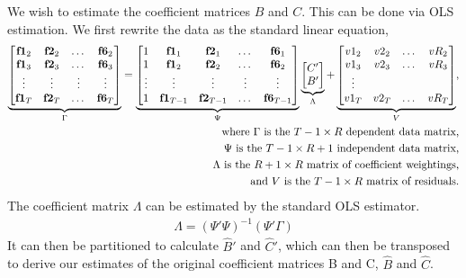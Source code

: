 \documentclass[11pt, letterpaper]{article}\usepackage[]{graphicx}\usepackage[]{color}
\newcommand{\vv}[1]{\textcolor{black}{\mathbf{#1}}}
\begin{document}
We wish to estimate the coefficient matrices $B$ and $C$. This can be done via OLS estimation. We first rewrite the data as the standard linear equation,
\begin{align*}
\underbrace{\begin{bmatrix}
\vv{f1}_{2} & \vv{f2}_{2} & \dots & \vv{f6}_{2}\\
\vv{f1}_{3} & \vv{f2}_{3} & \dots & \vv{f6}_{3}\\
\vdots & \vdots & \vdots & \vdots \\
\vv{f1}_{T} & \vv{f2}_{T} & \dots & \vv{f6}_{T}
\end{bmatrix}}_{\Gamma}
=
\underbrace{\begin{bmatrix}
1 & \vv{f1}_{1} & \vv{f2}_{1} & \dots & \vv{f6}_{1}\\
1 & \vv{f1}_{2} & \vv{f2}_{2} & \dots & \vv{f6}_{2}\\
\vdots & \vdots & \vdots & \vdots & \vdots \\
1 & \vv{f1}_{T-1} & \vv{f2}_{T-1} & \dots & \vv{f6}_{T-1}
\end{bmatrix}}_{\Psi}
\underbrace{\begin{bmatrix}
C'\\
B'
\end{bmatrix}}_{\Lambda}
 +
\underbrace{\begin{bmatrix}
v1_2 & v2_2 & \dots & vR_2\\
v1_3 & v2_3 & \dots & vR_3\\
\vdots\\
v1_T & v2_T & \dots & vR_T\\
\end{bmatrix}}_{V},\\
\text{where $\Gamma$ is the $T-1 \times R$ dependent data matrix,}\\
\text{$\Psi$ is the $T-1 \times R+1$ independent data matrix,}\\
\text{$\Lambda$ is the $R+1 \times R$ matrix of coefficient weightings,}\\
\text{and $V$ is the $T-1 \times R$ matrix of residuals.}
\end{align*}
The coefficient matrix $\Lambda$ can be estimated by the standard OLS estimator.
\begin{align*}
\widehat{\Lambda} = (\Psi' \Psi)^{-1} (\Psi'\Gamma)
\end{align*}
It can then be partitioned to calculate $\widehat{B}'$ and $\widehat{C}'$, which can then be transposed to derive our estimates of the original coefficient matrices B and C, $\widehat{B}$ and $\widehat{C}$.
\end{document}
